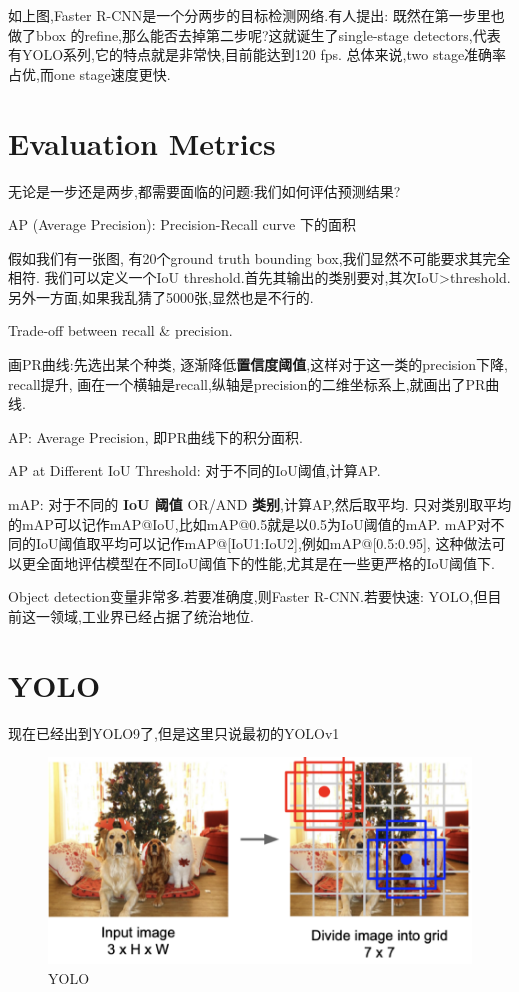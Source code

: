 如上图,Faster R-CNN是一个分两步的目标检测网络.有人提出:
既然在第一步里也做了bbox 的refine,那么能否去掉第二步呢?这就诞生了single-stage 
detectors,代表有YOLO系列,它的特点就是非常快,目前能达到120 fps.
总体来说,two stage准确率占优,而one stage速度更快.

\section{Evaluation Metrics}

无论是一步还是两步,都需要面临的问题:我们如何评估预测结果?


AP (Average Precision): Precision-Recall curve 下的面积

假如我们有一张图,
有20个ground truth bounding box,我们显然不可能要求其完全相符.
我们可以定义一个IoU threshold.首先其输出的类别要对,其次IoU>threshold.
另外一方面,如果我乱猜了5000张,显然也是不行的.

Trade-off between recall \& precision.

画PR曲线:先选出某个种类,
逐渐降低\textbf{置信度阈值},这样对于这一类的precision下降, recall提升, 
画在一个横轴是recall,纵轴是precision的二维坐标系上,就画出了PR曲线.

AP: Average Precision, 即PR曲线下的积分面积.

AP at Different IoU Threshold: 对于不同的IoU阈值,计算AP.

mAP: 对于不同的 \textbf{IoU 阈值} OR/AND \textbf{类别},计算AP,然后取平均.
只对类别取平均的mAP可以记作mAP@IoU,比如mAP@0.5就是以0.5为IoU阈值的mAP.
mAP对不同的IoU阈值取平均可以记作mAP@[IoU1:IoU2],例如mAP@[0.5:0.95],
这种做法可以更全面地评估模型在不同IoU阈值下的性能,尤其是在一些更严格的IoU阈值下.

Object detection变量非常多.若要准确度,则Faster R-CNN.若要快速:
YOLO,但目前这一领域,工业界已经占据了统治地位.

\section{YOLO}

现在已经出到YOLO9了,但是这里只说最初的YOLOv1

\begin{figure}[htbp]
    \centering
    \includegraphics[scale=0.3]{figures/YOLO.png}
    \caption{YOLO}
    \label{fig:YOLO}
\end{figure}

